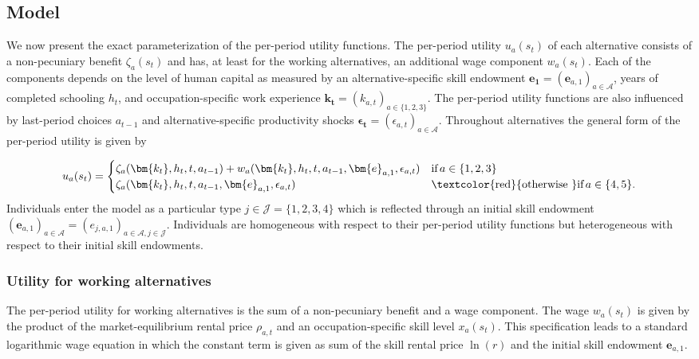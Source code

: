 \subsection{Model}\label{Computational implementation}
We now present the exact parameterization of the per-period utility functions. The per-period utility $u_a(s_t)$ of each alternative consists of a non-pecuniary benefit $\zeta_a(s_t)$ and has, at least for the working alternatives, an additional wage component $w_a(s_t)$. Each of the components depends on the level of human capital as measured by an alternative-specific skill endowment $\bm{e_1} = \left(\bm{e}_{a,1}\right)_{a\in\mathcal{A}}$, years of completed schooling $h_t$, and occupation-specific work experience $\bm{k_t} = \left(k_{a,t}\right)_{a\in\{1, 2, 3\}}$. The per-period utility functions are also influenced by last-period choices $a_{t -1}$ and alternative-specific productivity shocks
$\bm{\epsilon_t} = \left(\epsilon_{a,t}\right)_{a\in\mathcal{A}}$. Throughout alternatives the general form of the per-period utility is given by

\begin{align*}
u_a(s_t) =
\begin{cases}
    \zeta_a(\bm{k_t}, h_t, t, a_{t -1})  + w_a(\bm{k_t}, h_t, t, a_{t -1}, \bm{e}_{a,1}, \epsilon_{a,t})              & \text{if}\, a \in \{1, 2, 3\}  \\
    \zeta_a(\bm{k_t}, h_t, t, a_{t-1}, \bm{e}_{a,1}, \epsilon_{a,t})                                    & \text{\textcolor{red}{otherwise }} \text{if}\, a \in \{4, 5\}.
\end{cases}
\end{align*}
Individuals enter the model as a particular type $j \in \mathcal{J} = \{1, 2, 3, 4\}$ which is reflected through an initial skill endowment $\left(\bm{e}_{a,1}\right)_{a\in\mathcal{A}} = \left(e_{j,a,1}\right)_{a\in\mathcal{A}, j \in \mathcal{J}}$. Individuals are homogeneous with respect to their per-period utility functions but heterogeneous with respect to their initial skill endowments.
\subsubsection{Utility for working alternatives}
The per-period utility for working alternatives is the sum of a non-pecuniary benefit and a wage component. The wage $w_{a}(s_t)$ is given by the product of the market-equilibrium rental price $\rho_{a,t}$ and an occupation-specific skill level $x_{a}(s_t)$. This specification leads to a standard logarithmic wage equation in which the constant term is given as sum of the skill rental price $\ln(r)$ and the initial skill endowment $\bm{e}_{a,1}$.\\

